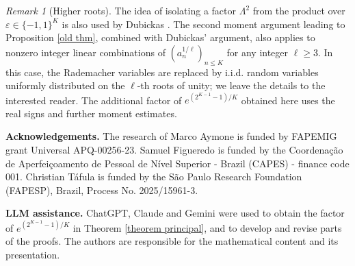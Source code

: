 \documentclass[reqno,12pt]{amsart}
\theoremstyle{remark}
\newtheorem{remark}[theorem]{Remark}
\begin{document}
\begin{remark}[Higher roots]
The idea of isolating a factor $\Lambda^2$ from the product over $\varepsilon\in\{-1,1\}^K$ is also used by Dubickas \cite{Dubickas_square_roots}. The second moment argument leading to Proposition \ref{old thm}, combined with Dubickas' argument, also applies to nonzero integer linear combinations of $(a_n^{1/\ell})_{n\leq K}$ for any integer $\ell\geq3$. In this case, the Rademacher variables are replaced by i.i.d. random variables uniformly distributed on the $\ell$-th roots of unity; we leave the details to the interested reader. The additional factor of $e^{(2^{K-1}-1)/K}$ obtained here uses the real signs and further moment estimates.
\end{remark}

\noindent\textbf{Acknowledgements.}
The research of Marco Aymone is funded by FAPEMIG grant Universal APQ-00256-23. Samuel Figueredo is funded by the Coordena\c c\~ao de Aperfei\c coamento de Pessoal de N\'ivel Superior - Brazil (CAPES) - finance code 001. Christian T\'afula is funded by the S\~ao Paulo Research Foundation (FAPESP), Brazil, Process No. 2025/15961-3.

\noindent\textbf{LLM assistance.}
ChatGPT, Claude and Gemini were used to obtain the factor of $e^{(2^{K-1}-1)/K}$ in Theorem \ref{theorem principal}, and to develop and revise parts of the proofs. The authors are responsible for the mathematical content and its presentation.
\end{document}
